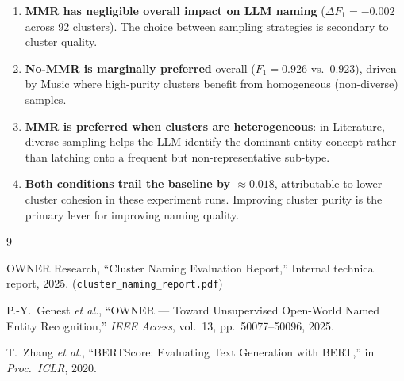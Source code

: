 \documentclass[11pt,a4paper]{article}
\begin{document}
\begin{enumerate}[leftmargin=1.5em]
  \item \textbf{MMR has negligible overall impact on LLM naming} ($\Delta F_1 = -0.002$ across 92 clusters).  The choice between sampling strategies is secondary to cluster quality.
  \item \textbf{No-MMR is marginally preferred} overall ($F_1 = 0.926$ vs.\ $0.923$), driven by Music where high-purity clusters benefit from homogeneous (non-diverse) samples.
  \item \textbf{MMR is preferred when clusters are heterogeneous}: in Literature, diverse sampling helps the LLM identify the dominant entity concept rather than latching onto a frequent but non-representative sub-type.
  \item \textbf{Both conditions trail the baseline by $\approx 0.018$}, attributable to lower cluster cohesion in these experiment runs.  Improving cluster purity is the primary lever for improving naming quality.
\end{enumerate}

\begin{thebibliography}{9}

OWNER Research,
``Cluster Naming Evaluation Report,''
Internal technical report, 2025.
(\texttt{cluster\_naming\_report.pdf})

P.-Y.\ Genest \textit{et al.},
``OWNER --- Toward Unsupervised Open-World Named Entity Recognition,''
\textit{IEEE Access}, vol.~13, pp.~50077--50096, 2025.

T.\ Zhang \textit{et al.},
``BERTScore: Evaluating Text Generation with BERT,''
in \textit{Proc.\ ICLR}, 2020.

\end{thebibliography}
\end{document}
